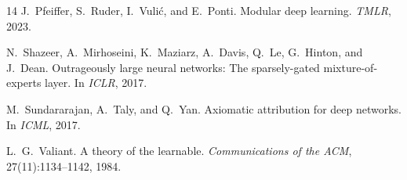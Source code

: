 \documentclass[11pt,a4paper]{article}
\begin{document}
\begin{thebibliography}{14}
J.~Pfeiffer, S.~Ruder, I.~Vuli\'{c}, and E.~Ponti.
\newblock Modular deep learning.
\newblock \emph{TMLR}, 2023.

N.~Shazeer, A.~Mirhoseini, K.~Maziarz, A.~Davis, Q.~Le, G.~Hinton, and J.~Dean.
\newblock Outrageously large neural networks: The sparsely-gated mixture-of-experts layer.
\newblock In \emph{ICLR}, 2017.

M.~Sundararajan, A.~Taly, and Q.~Yan.
\newblock Axiomatic attribution for deep networks.
\newblock In \emph{ICML}, 2017.

L.~G.~Valiant.
\newblock A theory of the learnable.
\newblock \emph{Communications of the ACM}, 27(11):1134--1142, 1984.

\end{thebibliography}
\end{document}
